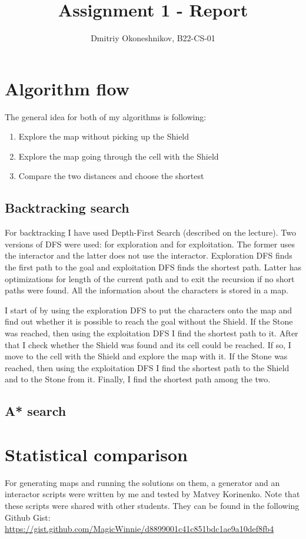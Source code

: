 \documentclass{article}
\title{Assignment 1 - Report}
\author{Dmitriy Okoneshnikov, B22-CS-01}
\begin{document}
\maketitle

\tableofcontents
\newpage

\section{Algorithm flow}
The general idea for both of my algorithms is following:
\begin{enumerate}
    \item Explore the map without picking up the Shield
    \item Explore the map going through the cell with the Shield
    \item Compare the two distances and choose the shortest
\end{enumerate}
\subsection{Backtracking search}
For backtracking I have used Depth-First Search (described on the lecture). Two versions of DFS were used: for exploration and for exploitation.
The former uses the interactor and the latter does not use the interactor. Exploration DFS finds the first path to the goal and exploitation DFS finds the shortest path.
Latter has optimizations for length of the current path and to exit the recursion if no short paths were found.
All the information about the characters is stored in a map.

I start of by using the exploration DFS to put the characters onto the map and find out whether it is possible to reach the goal without the Shield.
If the Stone was reached, then using the exploitation DFS I find the shortest path to it.
After that I check whether the Shield was found and its cell could be reached. If so, I move to the cell with the Shield and explore the map with it. 
If the Stone was reached, then using the exploitation DFS I find the shortest path to the Shield and to the Stone from it.
Finally, I find the shortest path among the two.

\subsection{A* search}


\section{Statistical comparison}
For generating maps and running the solutions on them, a generator and an interactor scripts were written by me and tested by Matvey Korinenko. Note that these scripts were shared with other students. They can be found in the following Github Gist: \url{https://gist.github.com/MagicWinnie/d8899001c41c851bdc1ae9a10def8fb4}
\end{document}
